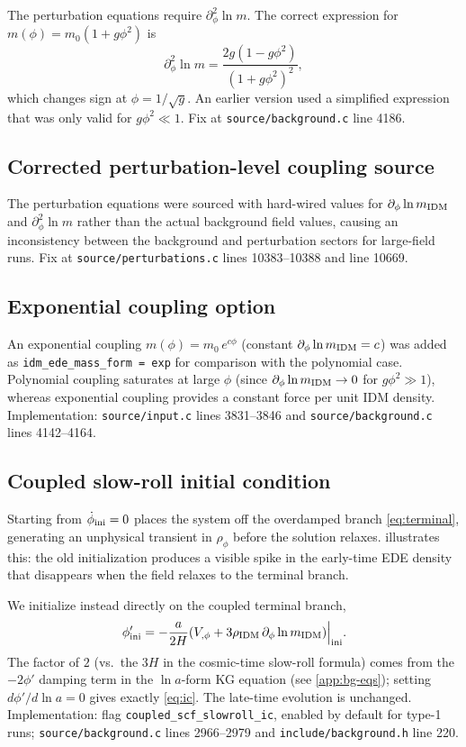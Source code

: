 \documentclass[aps,onecolumn,prd,nofootinbib,superscriptaddress,10pt,longbibliography,floatfix]{revtex4-2}
\newcommand{\dlnm}{\partial_\phi \ln m_{\rm IDM}}
\newcommand{\rIDM}{\rho_{\rm IDM}}
\begin{document}
The perturbation equations require $\partial_\phi^2\ln m$. The correct expression for $m(\phi)=m_0(1+g\phi^2)$ is
\begin{equation}
\partial_\phi^2\ln m = \frac{2g(1-g\phi^2)}{(1+g\phi^2)^2},
\end{equation}
which changes sign at $\phi=1/\sqrt{g}$. An earlier version used a simplified expression that was only valid for $g\phi^2\ll 1$. Fix at \texttt{source/background.c} line 4186.

\subsection{Corrected perturbation-level coupling source}

The perturbation equations were sourced with hard-wired values for $\dlnm$ and $\partial_\phi^2\ln m$ rather than the actual background field values, causing an inconsistency between the background and perturbation sectors for large-field runs. Fix at \texttt{source/perturbations.c} lines 10383--10388 and line 10669.

\subsection{Exponential coupling option}

An exponential coupling $m(\phi)=m_0\,e^{c\phi}$ (constant $\dlnm = c$) was added as \texttt{idm\_ede\_mass\_form = exp} for comparison with the polynomial case. Polynomial coupling saturates at large $\phi$ (since $\dlnm\to 0$ for $g\phi^2\gg1$), whereas exponential coupling provides a constant force per unit IDM density. Implementation: \texttt{source/input.c} lines 3831--3846 and \texttt{source/background.c} lines 4142--4164.

\subsection{Coupled slow-roll initial condition}
\label{app:ic}

Starting from $\dot\phi_{\rm ini}=0$ places the system off the overdamped branch \cref{eq:terminal}, generating an unphysical transient in $\rho_\phi$ before the solution relaxes.  illustrates this: the old initialization produces a visible spike in the early-time EDE density that disappears when the field relaxes to the terminal branch.

We initialize instead directly on the coupled terminal branch,
\begin{equation}
\phi'_{\rm ini} = -\frac{a}{2H}\!\left(V_{,\phi}+3\rIDM\,\dlnm\right)\!\Big|_{\rm ini}.
\label{eq:ic}
\end{equation}
The factor of $2$ (vs.\ the $3H$ in the cosmic-time slow-roll formula) comes from the $-2\phi'$ damping term in the $\ln a$-form KG equation (see \cref{app:bg-eqs}); setting $d\phi'/d\ln a=0$ gives exactly \cref{eq:ic}. The late-time evolution is unchanged. Implementation: flag \texttt{coupled\_scf\_slowroll\_ic}, enabled by default for type-1 runs; \texttt{source/background.c} lines 2966--2979 and \texttt{include/background.h} line 220.
\end{document}

